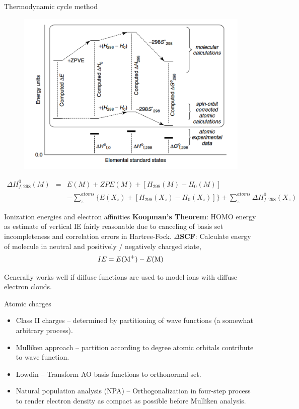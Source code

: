 \documentclass[aspectratio=169]{beamer}
\begin{document}
    \begin{frame}{Thermodynamic cycle method}
        \begin{figure}
            \centering
            \includegraphics[width=0.4\linewidth]{lectures/figures/4_energy_diagram.png}
        \end{figure}
        \begin{eqnarray*}
            \Delta H_{f,298}^0(M) & = & E(M) + ZPE(M) + [H_{298}(M) - H_0(M)]\\
            && - \sum_z^{atoms} \{E(X_z)+[H_{298}(X_z) - H_0(X_z)]\} + \sum_z^{atoms}\Delta H_{f,298}^0(X_z)
        \end{eqnarray*}

    \end{frame}

    \begin{frame}{Ionization energies and electron affinities}
        \textbf{Koopman’s Theorem}: HOMO energy as estimate of vertical IE fairly reasonable due to canceling of basis set incompleteness and correlation errors in Hartree-Fock.\newline
        \newline
        \textbf{$\Delta$SCF}: Calculate energy of molecule in neutral and positively / negatively charged state,
        \begin{equation*}
            IE = E(\ce{M+}) - E(\ce{M})
        \end{equation*}

        Generally works well if diffuse functions are used to model ions with diffuse electron clouds.
    \end{frame}

    \begin{frame}{Atomic charges}
        \begin{itemize}
            \item Class II charges – determined by partitioning of wave functions (a somewhat arbitrary process).
            \item Mulliken approach – partition according to degree atomic orbitals contribute to wave function.
            \item Lowdin – Transform AO basis functions to orthonormal set.
            \item Natural population analysis (NPA) – Orthogonalization in four-step process to render electron density as compact as possible before Mulliken analysis.
        \end{itemize}

    \end{frame}
\end{document}
